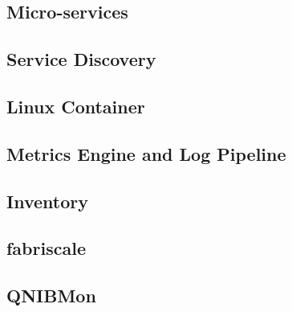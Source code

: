 \subsection{Micro-services}



\subsection{Service Discovery}


\subsection{Linux Container}


\subsection{Metrics Engine and Log Pipeline}




\subsection{Inventory}


\subsection{fabriscale}


\subsection{QNIBMon}
